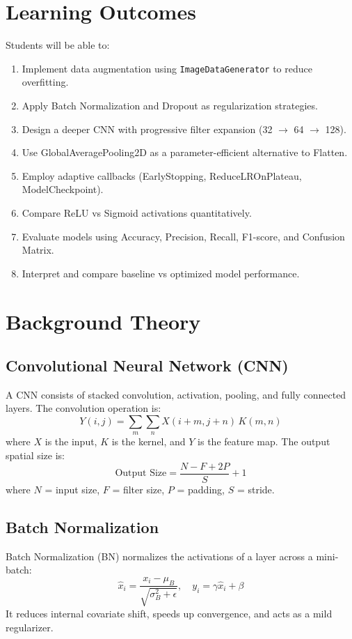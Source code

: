 \documentclass[11pt]{article}
\begin{document}
\section{Learning Outcomes}
Students will be able to:
\begin{enumerate}
    \item Implement data augmentation using \texttt{ImageDataGenerator} to reduce overfitting.
    \item Apply Batch Normalization and Dropout as regularization strategies.
    \item Design a deeper CNN with progressive filter expansion (32 $\rightarrow$ 64 $\rightarrow$ 128).
    \item Use GlobalAveragePooling2D as a parameter-efficient alternative to Flatten.
    \item Employ adaptive callbacks (EarlyStopping, ReduceLROnPlateau, ModelCheckpoint).
    \item Compare ReLU vs Sigmoid activations quantitatively.
    \item Evaluate models using Accuracy, Precision, Recall, F1-score, and Confusion Matrix.
    \item Interpret and compare baseline vs optimized model performance.
\end{enumerate}

\section{Background Theory}

\subsection{Convolutional Neural Network (CNN)}
A CNN consists of stacked convolution, activation, pooling, and fully connected layers. The convolution operation is:
\begin{equation}
    Y(i,j) = \sum_{m}\sum_{n}X(i+m,j+n)\,K(m,n)
\end{equation}
where $X$ is the input, $K$ is the kernel, and $Y$ is the feature map. The output spatial size is:
\begin{equation}
    \text{Output Size} = \frac{N - F + 2P}{S} + 1
\end{equation}
where $N$ = input size, $F$ = filter size, $P$ = padding, $S$ = stride.

\subsection{Batch Normalization}
Batch Normalization (BN) normalizes the activations of a layer across a mini-batch:
\begin{equation}
    \hat{x}_i = \frac{x_i - \mu_B}{\sqrt{\sigma_B^2 + \epsilon}}, \quad y_i = \gamma \hat{x}_i + \beta
\end{equation}
It reduces internal covariate shift, speeds up convergence, and acts as a mild regularizer.
\end{document}

